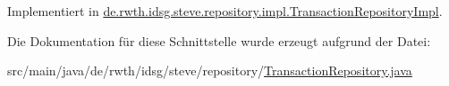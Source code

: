 Implementiert in \hyperlink{classde_1_1rwth_1_1idsg_1_1steve_1_1repository_1_1impl_1_1_transaction_repository_impl_a77bd16d6db0ae7bb1ab7a29dbe604628}{de.\-rwth.\-idsg.\-steve.\-repository.\-impl.\-Transaction\-Repository\-Impl}.



Die Dokumentation für diese Schnittstelle wurde erzeugt aufgrund der Datei\-:\begin{DoxyCompactItemize}
\item 
src/main/java/de/rwth/idsg/steve/repository/\hyperlink{_transaction_repository_8java}{Transaction\-Repository.\-java}\end{DoxyCompactItemize}
